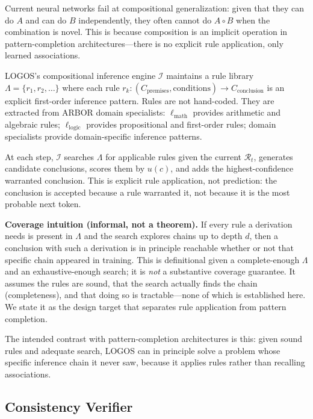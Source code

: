\documentclass[12pt]{article}
\begin{document}
Current neural networks fail at compositional generalization: given that they can do $A$ and can do $B$ independently, they often cannot do $A \circ B$ when the combination is novel. This is because composition is an implicit operation in pattern-completion architectures---there is no explicit rule application, only learned associations.

LOGOS's compositional inference engine $\mathcal{I}$ maintains a rule library $\Lambda = \{r_1, r_2, \ldots\}$ where each rule $r_k: (C_{\text{premises}}, \text{conditions}) \to C_{\text{conclusion}}$ is an explicit first-order inference pattern. Rules are not hand-coded. They are extracted from ARBOR domain specialists: $\ell_{\text{math}}$ provides arithmetic and algebraic rules; $\ell_{\text{logic}}$ provides propositional and first-order rules; domain specialists provide domain-specific inference patterns.

At each step, $\mathcal{I}$ searches $\Lambda$ for applicable rules given the current $\mathcal{R}_t$, generates candidate conclusions, scores them by $u(c)$, and adds the highest-confidence warranted conclusion. This is explicit rule application, not prediction: the conclusion is accepted because a rule warranted it, not because it is the most probable next token.

\medskip
\noindent\textbf{Coverage intuition (informal, not a theorem).} If every rule a derivation needs is present in $\Lambda$ and the search explores chains up to depth $d$, then a conclusion with such a derivation is in principle reachable whether or not that specific chain appeared in training. This is definitional given a complete-enough $\Lambda$ and an exhaustive-enough search; it is \emph{not} a substantive coverage guarantee. It assumes the rules are sound, that the search actually finds the chain (completeness), and that doing so is tractable---none of which is established here. We state it as the design target that separates rule application from pattern completion.

The intended contrast with pattern-completion architectures is this: given sound rules and adequate search, LOGOS can in principle solve a problem whose specific inference chain it never saw, because it applies rules rather than recalling associations.

\subsection{Consistency Verifier}
\end{document}
